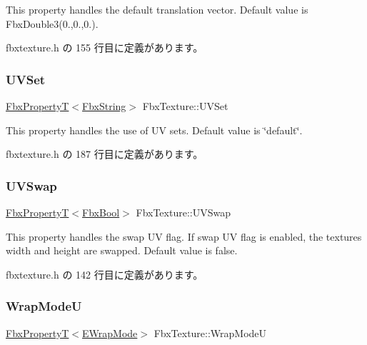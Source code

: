 This property handles the default translation vector. Default value is Fbx\+Double3(0.,0.,0.). 

 fbxtexture.\+h の 155 行目に定義があります。

\mbox{\label{class_fbx_texture_ae28f2e1c33fa74ab1e9752f9de0be552}} 
\subsubsection{\texorpdfstring{U\+V\+Set}{UVSet}}
{\footnotesize\ttfamily \hyperlink{class_fbx_property_t}{Fbx\+PropertyT}$<$\hyperlink{class_fbx_string}{Fbx\+String}$>$ Fbx\+Texture\+::\+U\+V\+Set}

This property handles the use of UV sets. Default value is \char`\"{}default\char`\"{}. 

 fbxtexture.\+h の 187 行目に定義があります。

\mbox{\label{class_fbx_texture_a8c14f57534caca44296248db850db26e}} 
\subsubsection{\texorpdfstring{U\+V\+Swap}{UVSwap}}
{\footnotesize\ttfamily \hyperlink{class_fbx_property_t}{Fbx\+PropertyT}$<$\hyperlink{fbxtypes_8h_a92e0562b2fe33e76a242f498b362262e}{Fbx\+Bool}$>$ Fbx\+Texture\+::\+U\+V\+Swap}

This property handles the swap UV flag. If swap UV flag is enabled, the texture\textquotesingle{}s width and height are swapped. Default value is false. 

 fbxtexture.\+h の 142 行目に定義があります。

\mbox{\label{class_fbx_texture_a0bc6524ab7ff1287b95ef46147660d7a}} 
\subsubsection{\texorpdfstring{Wrap\+ModeU}{WrapModeU}}
{\footnotesize\ttfamily \hyperlink{class_fbx_property_t}{Fbx\+PropertyT}$<$\hyperlink{class_fbx_texture_ae273dffe3ff532dfd57e7bdb15b121fd}{E\+Wrap\+Mode}$>$ Fbx\+Texture\+::\+Wrap\+ModeU}

